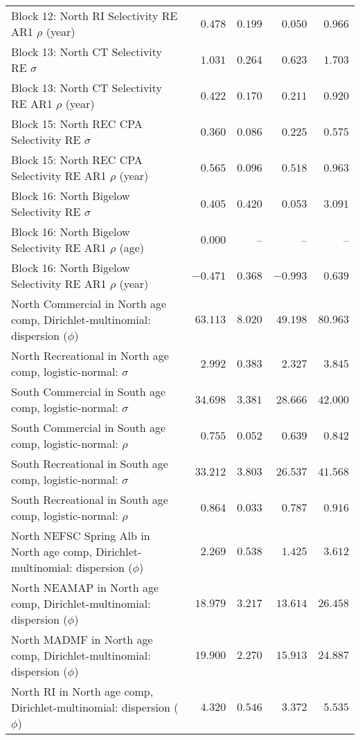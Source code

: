 \documentclass[
]{article}
\begin{document}
\begin{landscape}
\begin{longtable}[t]{lrrrr}
Block 12: North RI Selectivity RE AR1 $\rho$ (year) & $0.478$ & $0.199$ & $0.050$ & $0.966$\\
\addlinespace
Block 13: North CT Selectivity RE $\sigma$ & $1.031$ & $0.264$ & $0.623$ & $1.703$\\
Block 13: North CT Selectivity RE AR1 $\rho$ (year) & $0.422$ & $0.170$ & $0.211$ & $0.920$\\
Block 15: North REC CPA Selectivity RE $\sigma$ & $0.360$ & $0.086$ & $0.225$ & $0.575$\\
Block 15: North REC CPA Selectivity RE AR1 $\rho$ (year) & $0.565$ & $0.096$ & $0.518$ & $0.963$\\
Block 16: North Bigelow Selectivity RE $\sigma$ & $0.405$ & $0.420$ & $0.053$ & $3.091$\\
\addlinespace
Block 16: North Bigelow Selectivity RE AR1 $\rho$ (age) & $0.000$ & -- & -- & --\\
Block 16: North Bigelow Selectivity RE AR1 $\rho$ (year) & $-0.471$ & $0.368$ & $-0.993$ & $0.639$\\
North Commercial in North age comp, Dirichlet-multinomial: dispersion ($\phi$) & $63.113$ & $8.020$ & $49.198$ & $80.963$\\
North Recreational in North age comp, logistic-normal: $\sigma$ & $2.992$ & $0.383$ & $2.327$ & $3.845$\\
South Commercial in South age comp, logistic-normal: $\sigma$ & $34.698$ & $3.381$ & $28.666$ & $42.000$\\
\addlinespace
South Commercial in South age comp, logistic-normal: $\rho$ & $0.755$ & $0.052$ & $0.639$ & $0.842$\\
South Recreational in South age comp, logistic-normal: $\sigma$ & $33.212$ & $3.803$ & $26.537$ & $41.568$\\
South Recreational in South age comp, logistic-normal: $\rho$ & $0.864$ & $0.033$ & $0.787$ & $0.916$\\
North NEFSC Spring Alb in North age comp, Dirichlet-multinomial: dispersion ($\phi$) & $2.269$ & $0.538$ & $1.425$ & $3.612$\\
North NEAMAP in North age comp, Dirichlet-multinomial: dispersion ($\phi$) & $18.979$ & $3.217$ & $13.614$ & $26.458$\\
\addlinespace
North MADMF in North age comp, Dirichlet-multinomial: dispersion ($\phi$) & $19.900$ & $2.270$ & $15.913$ & $24.887$\\
North RI in North age comp, Dirichlet-multinomial: dispersion ($\phi$) & $4.320$ & $0.546$ & $3.372$ & $5.535$\\

\end{longtable}
\end{landscape}
\end{document}
